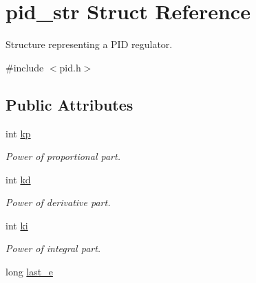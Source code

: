 \hypertarget{structpid__str}{
\section{pid\_\-str Struct Reference}
\label{structpid__str}
}


Structure representing a PID regulator.  




{\ttfamily \#include $<$pid.h$>$}

\subsection*{Public Attributes}
\begin{DoxyCompactItemize}
\item 
\hypertarget{structpid__str_a7c039d6ba7d0cc9d03fe3631f5ee5811}{
int \hyperlink{structpid__str_a7c039d6ba7d0cc9d03fe3631f5ee5811}{kp}}
\label{structpid__str_a7c039d6ba7d0cc9d03fe3631f5ee5811}

\begin{DoxyCompactList}\small\item\em Power of proportional part. \item\end{DoxyCompactList}\item 
\hypertarget{structpid__str_a0f9566f4e143fbbf1a8c4f3ab920f7cb}{
int \hyperlink{structpid__str_a0f9566f4e143fbbf1a8c4f3ab920f7cb}{kd}}
\label{structpid__str_a0f9566f4e143fbbf1a8c4f3ab920f7cb}

\begin{DoxyCompactList}\small\item\em Power of derivative part. \item\end{DoxyCompactList}\item 
\hypertarget{structpid__str_a1246caf4496665d0d9122ae001e9bbea}{
int \hyperlink{structpid__str_a1246caf4496665d0d9122ae001e9bbea}{ki}}
\label{structpid__str_a1246caf4496665d0d9122ae001e9bbea}

\begin{DoxyCompactList}\small\item\em Power of integral part. \item\end{DoxyCompactList}\item 
\hypertarget{structpid__str_afba88804d3ae4faf2c06e0199d553745}{
long \hyperlink{structpid__str_afba88804d3ae4faf2c06e0199d553745}{last\_\-e}}
\label{structpid__str_afba88804d3ae4faf2c06e0199d553745}


\end{DoxyCompactItemize}
